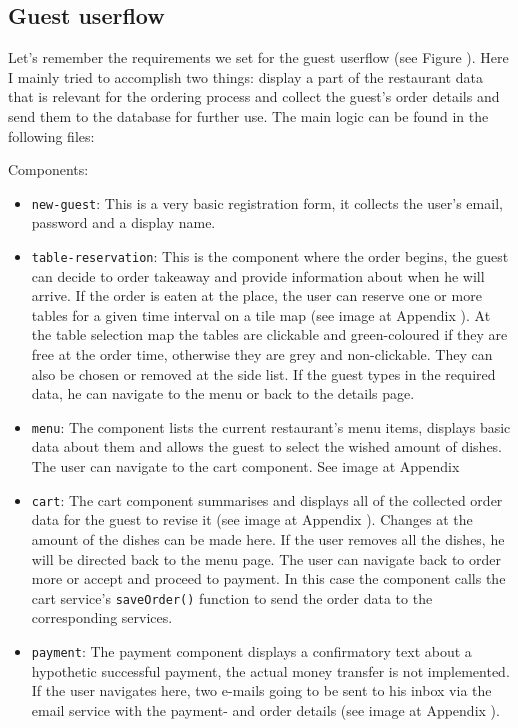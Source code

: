 \subsection{Guest userflow}

Let's remember the requirements we set for the guest userflow (see Figure ). Here I mainly tried to accomplish two things: display a part of the restaurant data that is relevant for the ordering process and collect the guest's order details and send them to the database for further use. The main logic can be found in the following files:

Components:
\begin{itemize}	
	\item \verb+new-guest+: This is a very basic registration form, it collects the user's email, password and a display name.
	\item \verb+table-reservation+: This is the component where the order begins, the guest can decide to order takeaway and provide information about when he will arrive. If the order is eaten at the place, the user can reserve one or more tables for a given time interval on a tile map (see image at Appendix ). At the table selection map the tables are clickable and green-coloured if they are free at the order time, otherwise they are grey and non-clickable. They can also be chosen or removed at the side list. If the guest types in the required data, he can navigate to the menu or back to the details page. 
	\item \verb+menu+: The component lists the current restaurant's menu items, displays basic data about them and allows the guest to select the wished amount of dishes. The user can navigate to the cart component. See image at Appendix 
	\item \verb+cart+: The cart component summarises and displays all of the collected order data for the guest to revise it (see image at Appendix ). Changes at the amount of the dishes can be made here. If the user removes all the dishes, he will be directed back to the menu page. The user can navigate back to order more or accept and proceed to payment. In this case the component calls the cart service's \verb+saveOrder()+ function to send the order data to the corresponding services.
	\item \verb+payment+: The payment component displays a confirmatory text about a hypothetic successful payment, the actual money transfer is not implemented. If the user navigates here, two e-mails going to be sent to his inbox via the email service with the payment- and order details (see image at Appendix ).

\end{itemize}
